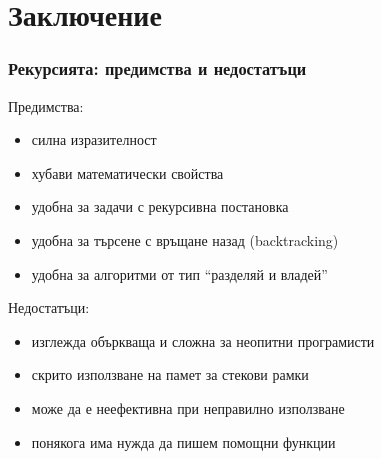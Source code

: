 \documentclass[alsotrans]{beamerswitch}
\begin{document}
\section{Заключение}

\begin{frame}
  \frametitle{Рекурсията: предимства и недостатъци}

  Предимства:
  \begin{itemize}[<+->]
  \item силна изразителност
  \item хубави математически свойства
  \item удобна за задачи с рекурсивна постановка
  \item удобна за търсене с връщане назад (backtracking)
  \item удобна за алгоритми от тип ``разделяй и владей''
  \end{itemize}
  \onslide<+->
  Недостатъци:
  \begin{itemize}[<+->]
  \item изглежда объркваща и сложна за неопитни програмисти
  \item скрито използване на памет за стекови рамки
  \item може да е неефективна при неправилно използване
  \item понякога има нужда да пишем помощни функции
  \end{itemize}
\end{frame}
\end{document}
